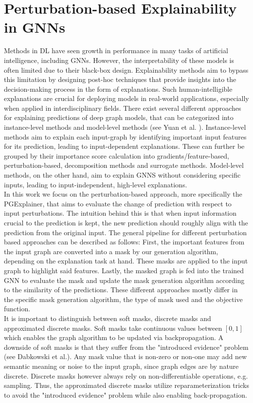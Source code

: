 \section{Perturbation-based Explainability in GNNs}
\label{sec:perturbation-based_explainability}
Methods in DL have seen growth in performance in many tasks of artificial intelligence, including GNNs. However, the interpretability of these models is often limited due to their black-box design. Explainability methods aim to bypass this limitation by designing post-hoc techniques that provide insights into the decision-making process in the form of explanations. Such human-intelligible explanations are crucial for deploying models in real-world applications, especially when applied in interdisciplinary fields. There exist several different approaches for explaining predictions of deep graph models, that can be categorized into instance-level methods and model-level methods (see Yuan et al. \cite{yuan2022explainability}). Instance-level methods aim to explain each input-graph by identifying important input features for its prediction, leading to input-dependent explanations. These can further be grouped by their importance score calculation into gradients/feature-based, perturbation-based, decomposition methods and surrogate methods. Model-level methods, on the other hand, aim to explain GNNS without considering specific inputs, leading to input-independent, high-level explanations. \\
In this work we focus on the perturbation-based approach, more specifically the PGExplainer\cite{luo2020parameterized}, that aims to evaluate the change of prediction with respect to input perturbations. The intuition behind this is that when input information crucial to the prediction is kept, the new prediction should roughly align with the prediction from the original input. The general pipeline for different perturbation based approaches can be described as follows: First, the important features from the input graph are converted into a mask by our generation algorithm, depending on the explanation task at hand. These masks are applied to the input graph to highlight said features. Lastly, the masked graph is fed into the trained GNN to evaluate the mask and update the mask generation algorithm according to the similarity of the predictions. These different approaches mostly differ in the specific mask generation algorithm, the type of mask used and the objective function. \\
It is important to distinguish between soft masks, discrete masks and approximated discrete masks. Soft masks take continuous values between $[0,1]$ which enables the graph algorithm to be updated via backpropagation. A downside of soft masks is that they suffer from the "introduced evidence" problem (see Dabkowski et al.\cite{dabkowski2017real}). Any mask value that is non-zero or non-one may add new semantic meaning or noise to the input graph, since graph edges are by nature discrete. Discrete masks however always rely on non-differentiable operations, e.g. sampling. Thus, the approximated discrete masks utilize reparameterization tricks to avoid the "introduced evidence" problem while also enabling back-propagation. %

